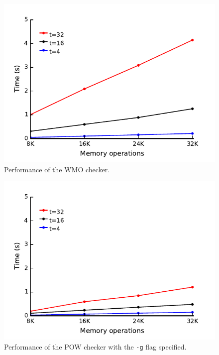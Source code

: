 \documentclass[11pt]{article}
\begin{document}
\begin{figure}
\begin{center}
\includegraphics{performance/wmo.pdf}
\end{center}
\caption{Performance of the WMO checker.}
\label{Graph:WMO}
\end{figure}

\begin{figure}
\begin{center}
\includegraphics{performance/pow.pdf}
\end{center}
\caption{Performance of the POW checker with the \texttt{-g} flag specified.}
\label{Graph:POW}
\end{figure}
\end{document}
